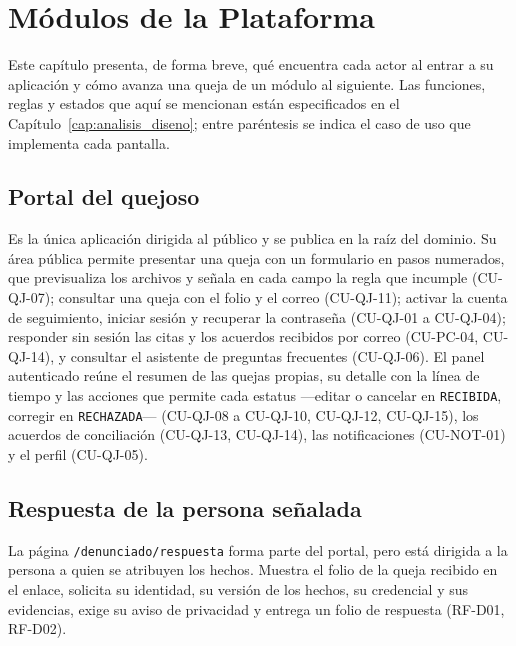	\chapter{Módulos de la Plataforma}
	\label{cap:modulos}
	Este capítulo presenta, de forma breve, qué encuentra cada actor al entrar a su aplicación y cómo
	avanza una queja de un módulo al siguiente. Las funciones, reglas y estados que aquí se mencionan
	están especificados en el Capítulo~\ref{cap:analisis_diseno}; entre paréntesis se indica el caso de
	uso que implementa cada pantalla.

	\section{Portal del quejoso}
	\label{sec:modulo_quejoso}
	Es la única aplicación dirigida al público y se publica en la raíz del dominio. Su área pública
	permite presentar una queja con un formulario en pasos numerados, que previsualiza los archivos y
	señala en cada campo la regla que incumple (CU-QJ-07); consultar una queja con el folio y el correo
	(CU-QJ-11); activar la cuenta de seguimiento, iniciar sesión y recuperar la contraseña (CU-QJ-01 a
	CU-QJ-04); responder sin sesión las citas y los acuerdos recibidos por correo (CU-PC-04, CU-QJ-14), y
	consultar el asistente de preguntas frecuentes (CU-QJ-06). El panel autenticado reúne el resumen de
	las quejas propias, su detalle con la línea de tiempo y las acciones que permite cada estatus
	---editar o cancelar en \texttt{RECIBIDA}, corregir en \texttt{RECHAZADA}--- (CU-QJ-08 a CU-QJ-10,
	CU-QJ-12, CU-QJ-15), los acuerdos de conciliación (CU-QJ-13, CU-QJ-14), las notificaciones
	(CU-NOT-01) y el perfil (CU-QJ-05).

	\section{Respuesta de la persona señalada}
	\label{sec:modulo_denunciado}
	La página \texttt{/denunciado/respuesta} forma parte del portal, pero está dirigida a la persona a
	quien se atribuyen los hechos. Muestra el folio de la queja recibido en el enlace, solicita su
	identidad, su versión de los hechos, su credencial y sus evidencias, exige su aviso de privacidad y
	entrega un folio de respuesta (RF-D01, RF-D02).

